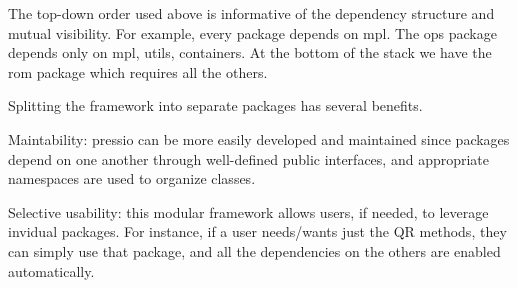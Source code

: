 The top-\/down order used above is informative of the dependency structure and mutual visibility. For example, every package depends on {\ttfamily mpl}. The {\ttfamily ops} package depends only on {\ttfamily mpl}, {\ttfamily utils}, {\ttfamily containers}. At the bottom of the stack we have the {\ttfamily rom} package which requires all the others.

Splitting the framework into separate packages has several benefits.
\begin{DoxyItemize}
\item Maintability\+: {\ttfamily pressio} can be more easily developed and maintained since packages depend on one another through well-\/defined public interfaces, and appropriate namespaces are used to organize classes.
\item Selective usability\+: this modular framework allows users, if needed, to leverage invidual packages. For instance, if a user needs/wants just the QR methods, they can simply use that package, and all the dependencies on the others are enabled automatically. 
\end{DoxyItemize}